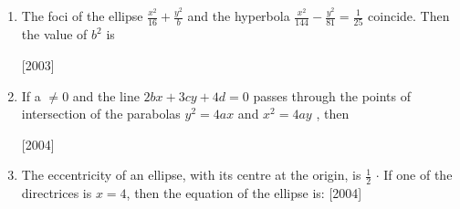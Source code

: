 \documentclass[journal,12pt,twocolumn]{IEEEtran}
\theoremstyle{remark}
\begin{document}
\begin{enumerate}
\item The foci of the ellipse {$ \frac{x^2}{16} + \frac{y^2}{b} $} and the hyperbola {$ \frac{x^2}{144} - \frac{y^2}{81} = \frac{1}{25} $} coincide. Then the value of {$ b^2 $} is 

\hfill
\hfill {[2003]}

	
\begin{enumerate}[label=(\alph*)]
\end{enumerate}


\hfill

\item If a $ \neq 0 $ and the line {$ 2bx +3cy + 4d = 0 $} passes through the points of intersection of the parabolas {$ y^2 = 4ax $} and {$  x^2 = 4ay $} , then 

\hfill
\hfill{[2004]}

\begin{enumerate}[label=(\alph*)]
\end{enumerate}

\hfill

\item The eccentricity of an ellipse, with its centre at the origin, is {$ \frac{1}{2} $} {$ \cdot $} If one of the directrices is {$ x = 4 $}, then the equation of the ellipse is: \hfill{[2004]}

\begin{enumerate}[label=(\alph*)]
\end{enumerate}
\end{enumerate}
\end{document}
